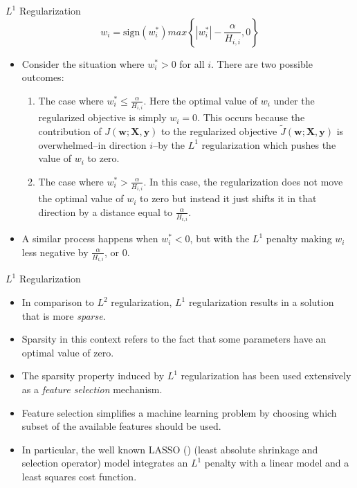 \documentclass[10pt]{beamer}
\begin{document}
	\begin{frame}{$L^1$ Regularization}
		$$w_i=\mathrm{sign}(w_i^*)max\left\{\left|w_i^*\right|-\frac{\alpha}{H_{i,i}}, 0\right\}$$
		
		\begin{itemize}
			\pause
			\item Consider the situation where $w_i^*>0$ for all $i$. There are two possible outcomes:
			\begin{enumerate}
				\pause
				\item The case where $w_i^*\leq\frac{\alpha}{H_{i,i}}$. Here the optimal value of $w_i$ under the regularized objective is simply $w_i=0$. This occurs because the contribution of $J(\bm{w};\bm{X},\bm{y})$ to the regularized objective $\tilde{J}(\bm{w};\bm{X},\bm{y})$ is overwhelmed--in direction $i$--by the $L^1$ regularization which pushes the value of $w_i$ to zero.
				\pause
				\item The case where $w_i^*>\frac{\alpha}{H_{i,i}}$. In this case, the regularization does not move the optimal value of $w_i$ to zero but instead it just shifts it in that direction by a distance equal to $\frac{\alpha}{H_{i,i}}$.
			\end{enumerate}
			\pause
			\item A similar process happens when $w_i^*<0$, but with the $L^1$ penalty making $w_i$ less negative by $\frac{\alpha}{H_{i,i}}$, or 0.
		\end{itemize}
	\end{frame}

	\begin{frame}{$L^1$ Regularization}
		\begin{itemize}
			\item In comparison to $L^2$ regularization, $L^1$ regularization results in a solution that is more \emph{sparse}.
			\pause
			\item Sparsity in this context refers to the fact that some parameters have an optimal value of zero.
			\pause
			\item The sparsity property induced by $L^1$ regularization has been used extensively as a \emph{feature selection} mechanism.
			\pause
			\item Feature selection simplifies a machine learning problem by choosing which subset of the available features should be used.
			\pause
			\item In particular, the well known LASSO (\citep{tibshirani1996regression}) (least absolute shrinkage and selection operator) model integrates an $L^1$ penalty with a linear model and a least squares cost function.
		\end{itemize}
	\end{frame}
\end{document}
